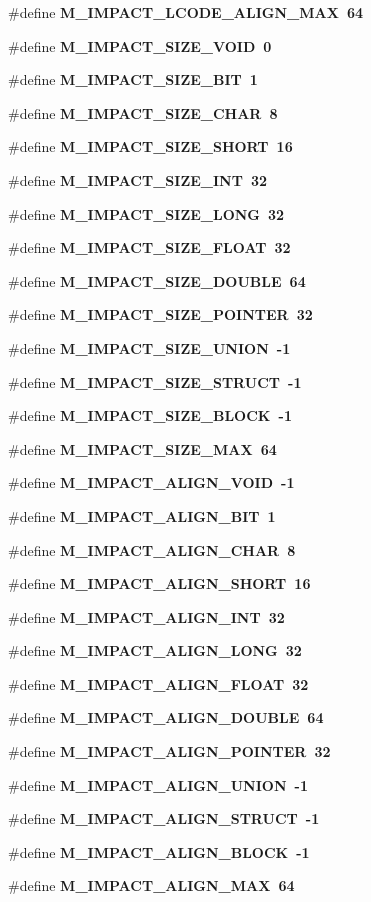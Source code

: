 \begin{CompactItemize}
\item 
\#define \bf{M\_\-IMPACT\_\-LCODE\_\-ALIGN\_\-MAX}~64
\item 
\#define \bf{M\_\-IMPACT\_\-SIZE\_\-VOID}~0
\item 
\#define \bf{M\_\-IMPACT\_\-SIZE\_\-BIT}~1
\item 
\#define \bf{M\_\-IMPACT\_\-SIZE\_\-CHAR}~8
\item 
\#define \bf{M\_\-IMPACT\_\-SIZE\_\-SHORT}~16
\item 
\#define \bf{M\_\-IMPACT\_\-SIZE\_\-INT}~32
\item 
\#define \bf{M\_\-IMPACT\_\-SIZE\_\-LONG}~32
\item 
\#define \bf{M\_\-IMPACT\_\-SIZE\_\-FLOAT}~32
\item 
\#define \bf{M\_\-IMPACT\_\-SIZE\_\-DOUBLE}~64
\item 
\#define \bf{M\_\-IMPACT\_\-SIZE\_\-POINTER}~32
\item 
\#define \bf{M\_\-IMPACT\_\-SIZE\_\-UNION}~-1
\item 
\#define \bf{M\_\-IMPACT\_\-SIZE\_\-STRUCT}~-1
\item 
\#define \bf{M\_\-IMPACT\_\-SIZE\_\-BLOCK}~-1
\item 
\#define \bf{M\_\-IMPACT\_\-SIZE\_\-MAX}~64
\item 
\#define \bf{M\_\-IMPACT\_\-ALIGN\_\-VOID}~-1
\item 
\#define \bf{M\_\-IMPACT\_\-ALIGN\_\-BIT}~1
\item 
\#define \bf{M\_\-IMPACT\_\-ALIGN\_\-CHAR}~8
\item 
\#define \bf{M\_\-IMPACT\_\-ALIGN\_\-SHORT}~16
\item 
\#define \bf{M\_\-IMPACT\_\-ALIGN\_\-INT}~32
\item 
\#define \bf{M\_\-IMPACT\_\-ALIGN\_\-LONG}~32
\item 
\#define \bf{M\_\-IMPACT\_\-ALIGN\_\-FLOAT}~32
\item 
\#define \bf{M\_\-IMPACT\_\-ALIGN\_\-DOUBLE}~64
\item 
\#define \bf{M\_\-IMPACT\_\-ALIGN\_\-POINTER}~32
\item 
\#define \bf{M\_\-IMPACT\_\-ALIGN\_\-UNION}~-1
\item 
\#define \bf{M\_\-IMPACT\_\-ALIGN\_\-STRUCT}~-1
\item 
\#define \bf{M\_\-IMPACT\_\-ALIGN\_\-BLOCK}~-1
\item 
\#define \bf{M\_\-IMPACT\_\-ALIGN\_\-MAX}~64
\end{CompactItemize}
